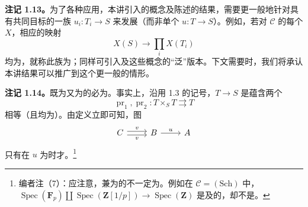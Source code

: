 \textbf{注记 1.13。}为了各种应用，本讲引入的概念及陈述的结果，需要更一般地针对具有共同目标的一族 $u_i:T_i\to S$ 来发展（而非单个 $u:T\to S$）。例如，若对 $\mathcal C$ 的每个 $X$，相应的映射
\[
 X(S)\longrightarrow\prod_i X(T_i)
\]
均为，就称此族为；同样可引入及这些概念的“泛”版本。下文需要时，我们将承认本讲结果可以推广到这个更一般的情形。

\textbf{注记 1.14。}既为又为的必为。事实上，沿用 1.3 的记号，$T\to S$ 是蕴含两个
\[
 \operatorname{pr}_1,\operatorname{pr}_2:T\times_S T\rightrightarrows T
\]
相等（且均为）。由定义立即可知，图
\[
\begin{tikzcd}C\arrow[r,shift left=.5ex,"v"]\arrow[r,shift right=.5ex,"v"']&B\arrow[r,"u"]&A\end{tikzcd}
\]
只有在 $u$ 为时才。\footnote{编者注（7）：应注意，兼为的不一定为。例如在 $\mathcal C=(\mathrm{Sch})$ 中， $\operatorname{Spec}(\mathbf F_p)\amalg\operatorname{Spec}(\mathbf Z[1/p])\to\operatorname{Spec}(\mathbf Z)$ 是及的，却不是。}

